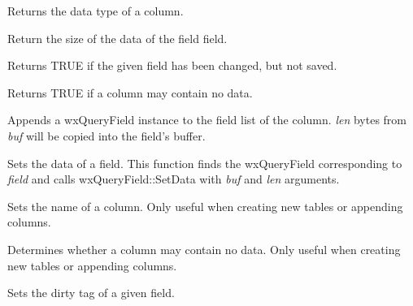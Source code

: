 

Returns the data type of a column.



Return the size of the data of the field field.



Returns TRUE if the given field has been changed, but not saved.



Returns TRUE if a column may contain no data.



Appends a wxQueryField instance to the field list of the column. {\it len} bytes from\rtfsp
{\it buf} will be copied into the field's buffer.



Sets the data of a field. This function finds the wxQueryField corresponding to\rtfsp
{\it field} and calls wxQueryField::SetData with {\it buf} and {\it len} arguments.



Sets the name of a column. Only useful when creating new tables or
appending columns.
 


Determines whether a column may contain no data. Only useful when creating new tables or
appending columns.



Sets the dirty tag of a given field.

